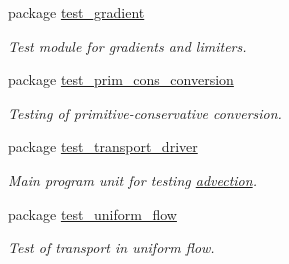 \begin{CompactItemize}
\item 
package \hyperlink{a00041}{test\_\-gradient}
\begin{CompactList}\small\item\em Test module for gradients and limiters. \item\end{CompactList}

\item 
package \hyperlink{a00042}{test\_\-prim\_\-cons\_\-conversion}
\begin{CompactList}\small\item\em Testing of primitive-conservative conversion. \item\end{CompactList}

\item 
package \hyperlink{a00043}{test\_\-transport\_\-driver}
\begin{CompactList}\small\item\em Main program unit for testing \hyperlink{a00026}{advection}. \item\end{CompactList}

\item 
package \hyperlink{a00044}{test\_\-uniform\_\-flow}
\begin{CompactList}\small\item\em Test of transport in uniform flow. \item\end{CompactList}

\end{CompactItemize}

